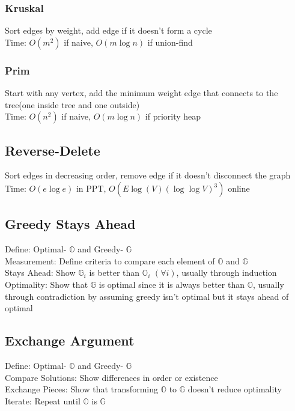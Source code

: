 \documentclass{article}
\begin{document}
\begin{multicols*}{2}
        \subsubsection*{Kruskal}
        Sort edges by weight, add edge if it doesn't form a cycle\\
        Time: $O(m^2)$ if naive, $O(m\log n)$ if union-find
        \subsubsection*{Prim}
        Start with any vertex, add the minimum weight edge that connects to the tree(one inside
        tree and one outside)\\
        Time: $O(n^2)$ if naive, $O(m\log n)$ if priority heap
        \subsection*{Reverse-Delete}
        Sort edges in decreasing order, remove edge if it doesn't disconnect the graph\\
        Time: $O(e\log e)$ in PPT, $O(E\log(V)(\log\log V)^3)$ online
        \subsection*{Greedy Stays Ahead}
        Define: Optimal- $\mathbb{O}$ and Greedy- $\mathbb{G}$\\
        Measurement: Define criteria to compare each element of $\mathbb{O}$ and $\mathbb{G}$\\
        Stays Ahead: Show $\mathbb{G}_i$ is better than $\mathbb{O}_i$ $(\forall i)$, usually
        through induction\\
        Optimality: Show that $\mathbb{G}$ is optimal since it is always better than $\mathbb{O}$,
        usually through contradiction by assuming greedy isn't optimal but it stays ahead of optimal
        \subsection*{Exchange Argument}
        Define: Optimal- $\mathbb{O}$ and Greedy- $\mathbb{G}$\\
        Compare Solutions: Show differences in order or existence\\
        Exchange Pieces: Show that transforming $\mathbb{O}$ to $\mathbb{G}$ doesn't reduce
        optimality\\
        Iterate: Repeat until $\mathbb{O}$ is $\mathbb{G}$

\end{multicols*}
\end{document}
